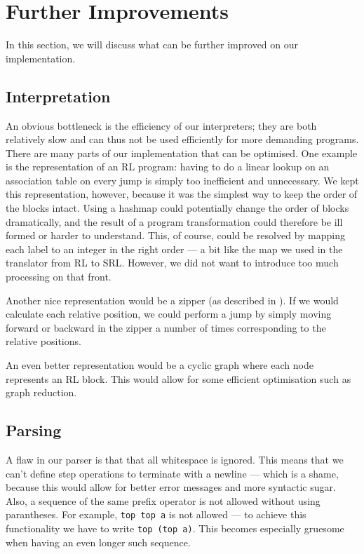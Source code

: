 \section{Further Improvements}
In this section, we will discuss what can be further improved on our implementation.

\subsection{Interpretation}
An obvious bottleneck is the efficiency of our interpreters; they are both relatively slow and can thus not be used efficiently for more demanding programs. There are many parts of our implementation that can be optimised. One example is the representation of an RL program: having to do a linear lookup on an association table on every jump is simply too inefficient and unnecessary. We kept this representation, however, because it was the simplest way to keep the order of the blocks intact. Using a hashmap could potentially change the order of blocks dramatically, and the result of a program transformation could therefore be ill formed or harder to understand. This, of course, could be resolved by mapping each label to an integer in the right order --- a bit like the map we used in the translator from RL to SRL. However, we did not want to introduce too much processing on that front.

Another nice representation would be a zipper (as described in \cite{ZIP}). If we would calculate each relative position, we could perform a jump by simply moving forward or backward in the zipper a number of times corresponding to the relative positions.

An even better representation would be a cyclic graph where each node represents an RL block. This would allow for some efficient optimisation such as graph reduction.

\subsection{Parsing}
A flaw in our parser is that that all whitespace is ignored. This means that we can't define step operations to terminate with a newline --- which is a shame, because this would allow for better error messages and more syntactic sugar. Also, a sequence of the same prefix operator is not allowed without using parantheses. For example, \texttt{top top a} is not allowed --- to achieve this functionality we have to write \texttt{top (top a)}. This becomes especially gruesome when having an even longer such sequence.

